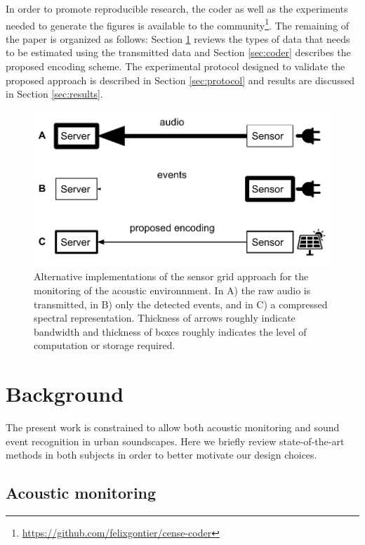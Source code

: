 \documentclass[final,3p,times,twocolumn]{elsarticle}
\begin{document}
In order to promote reproducible research, the coder as well as the experiments needed to generate the figures is available to the community\footnote{\url{https://github.com/felixgontier/cense-coder}}. The remaining of the paper is organized as follows: Section \ref{sec:background} reviews the types of data that needs to be estimated using the transmitted data and Section \ref{sec:coder} describes the proposed encoding scheme. The experimental protocol designed to validate the proposed approach is described in Section \ref{sec:protocol} and results are discussed in Section \ref{sec:results}.


\begin{figure}[t]
\includegraphics[width=\columnwidth]{figures/censeCoder}
\vspace{-0.15in}
\caption{Alternative implementations of the sensor grid approach for the monitoring of the acoustic environnment. In A) the raw audio is transmitted, in B) only the detected events, and in C) a compressed spectral representation. Thickness of arrows roughly indicate bandwidth and thickness of boxes roughly indicates the level of computation or storage required.}
\label{fig:codingScheme}
\end{figure}


\section{Background} \label{sec:background}


The present work is constrained to allow both acoustic monitoring and sound event recognition in urban soundscapes. Here we briefly review state-of-the-art methods in both subjects in order to better motivate our design choices.

\subsection{Acoustic monitoring}
\end{document}
